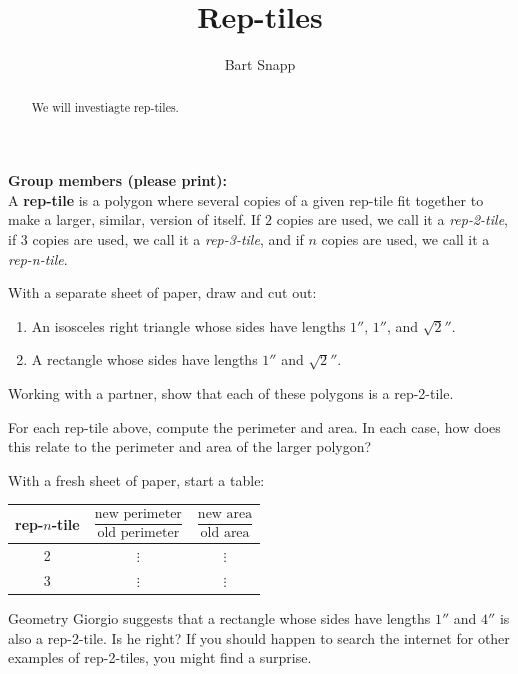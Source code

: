 \documentclass[handout,nooutcomes,noauthor]{ximera}
\title{Rep-tiles}
\author{Bart Snapp}
\begin{document}
\begin{abstract}
  We will investiagte rep-tiles.
\end{abstract}
\maketitle

\noindent\textbf{Group members (please print):}\ \hrulefill \\

\hrulefill
A \textbf{rep-tile} is a polygon where several copies of
a given rep-tile fit together to make a larger, similar, version of
itself. If $2$ copies are used, we call it a \textit{rep-2-tile}, if
$3$ copies are used, we call it a \textit{rep-3-tile}, and if $n$ copies
are used, we call it a \textit{rep-n-tile}.


\begin{problem}
With a separate sheet of paper, draw and cut out:
\begin{enumerate}
\item An isosceles right triangle whose sides have lengths $1''$, $1''$, and $\sqrt{2}''$.
\item A rectangle whose sides have lengths $1''$ and $\sqrt{2}''$.
\end{enumerate}
Working with a partner, show that each of these polygons is a rep-2-tile.
\end{problem}

\begin{problem}
For each rep-tile above, compute the perimeter and area. In each case,
how does this relate to the perimeter and area of the larger polygon?
\end{problem}


\begin{problem}
With a fresh sheet of paper, start a table:
\begin{center}
\begin{tabular}{c|c|c}
rep-$n$-tile & $\dfrac{\text{new perimeter}}{\text{old perimeter}}$ & $\dfrac{\text{new area}}{\text{old area}}$  \\
\hline\hline
 2 & $\vdots$  &  $\vdots$  \\ 
3 & $\vdots$  &  $\vdots$  \\ 
\end{tabular}
\end{center}
\end{problem}


\begin{problem}
Geometry Giorgio suggests that a rectangle whose sides have lengths
$1''$ and $4''$ is also a rep-2-tile. Is he right? If you should
happen to search the internet for other examples of rep-2-tiles, you
might find a surprise.
\end{problem}
\end{document}
